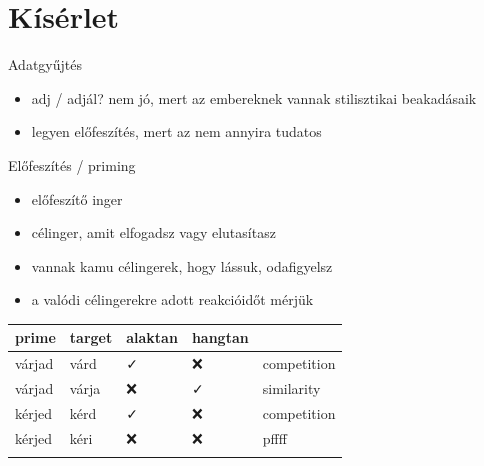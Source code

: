 \section{Kísérlet}\label{kuxedsuxe9rlet}

\begin{frame}{Adatgyűjtés}
\protect{}\label{adatgyux171jtuxe9s}
\begin{itemize}
\tightlist
\item
  adj / adjál? nem jó, mert az embereknek vannak stilisztikai
  beakadásaik
\item
  legyen előfeszítés, mert az nem annyira tudatos
\end{itemize}
\end{frame}

\begin{frame}{Előfeszítés / priming}
\protect{}\label{elux151feszuxedtuxe9s-priming}
\begin{itemize}
\tightlist
\item
  előfeszítő inger
\item
  célinger, amit elfogadsz vagy elutasítasz
\item
  vannak kamu célingerek, hogy lássuk, odafigyelsz
\item
  a valódi célingerekre adott reakcióidőt mérjük
\end{itemize}
\end{frame}

\begin{frame}
{\def\LTcaptype{none} %
\begin{longtable}[]{@{}lllll@{}}
\toprule\noalign{}
prime & target & alaktan & hangtan & \\
\midrule\noalign{}
\endhead
várjad & várd & ✓ & ❌ & competition \\
várjad & várja & ❌ & ✓ & similarity \\
kérjed & kérd & ✓ & ❌ & competition \\
kérjed & kéri & ❌ & ❌ & pffff \\
\bottomrule\noalign{}
\end{longtable}
}
\end{frame}

